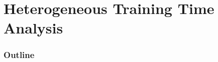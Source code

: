 \documentclass{beamer}
\begin{document}

\section{Heterogeneous Training Time Analysis}
\begin{frame}
  \frametitle{Outline}
  \tableofcontents[currentsection]
\end{frame}
\end{document}
